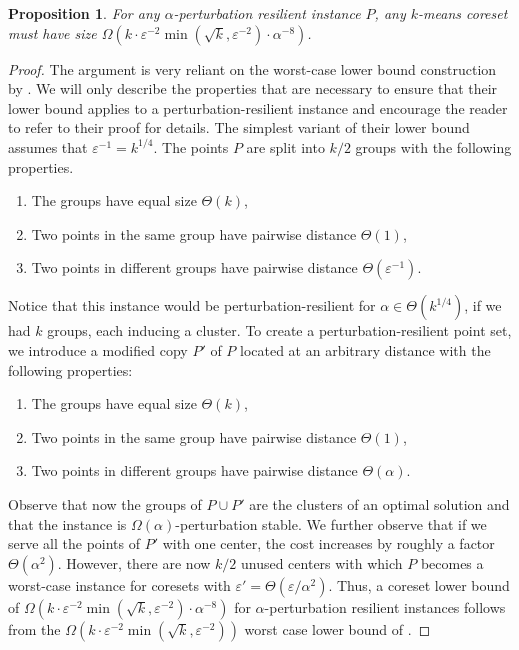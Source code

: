 \documentclass[11pt]{article}
\newtheorem{proposition}[lemma]{Proposition}
\theoremstyle{restate}
\theoremstyle{definition}
\begin{document}
\begin{proposition}
For any $\alpha$-perturbation resilient instance $P$, any $k$-means coreset must have size $\Omega(k\cdot \varepsilon^{-2}\min(\sqrt{k},\varepsilon^{-2}) \cdot \alpha^{-8})$.
\end{proposition}
\begin{proof}
The argument is very reliant on the worst-case lower bound construction by \cite{HLW23}.
We will only describe the properties that are necessary to ensure that their lower bound applies to a perturbation-resilient instance and encourage the reader to refer to their proof for details.
The simplest variant of their lower bound assumes that $\varepsilon^{-1} = k^{1/4}.$
The points $P$ are split into $k/2$ groups with the following properties.
\begin{enumerate}
    \item The groups have equal size $\Theta(k)$,
    \item Two points in the same group have pairwise distance $\Theta(1)$,
    \item Two points in different groups have pairwise distance $\Theta(\varepsilon^{-1})$.
\end{enumerate}



Notice that this instance would be perturbation-resilient for $\alpha\in \Theta(k^{1/4})$, if we had $k$ groups, each inducing a cluster.
To create a perturbation-resilient point set, we introduce a modified copy $P'$ of $P$ located at an arbitrary distance with the following properties:
\begin{enumerate}
    \item The groups have equal size $\Theta(k)$,
    \item Two points in the same group have pairwise distance $\Theta(1)$,
    \item Two points in different groups have pairwise distance $\Theta(\alpha)$.
\end{enumerate}

Observe that now the groups of $P\cup P'$ are the clusters of an optimal solution and that the instance is $\Omega(\alpha)$-perturbation stable. We further observe that if we serve all the points of $P'$ with one center, the cost increases by roughly a factor $\Theta(\alpha^2)$.
However,  there are now $k/2$ unused centers with which $P$ becomes a worst-case instance for coresets with $\varepsilon' = \Theta(\varepsilon/\alpha^2)$. Thus, a coreset lower bound of $\Omega(k\cdot \varepsilon^{-2}\min(\sqrt{k},\varepsilon^{-2}) \cdot \alpha^{-8})$ for $\alpha$-perturbation resilient instances follows from the $\Omega(k\cdot \varepsilon^{-2}\min(\sqrt{k},\varepsilon^{-2}))$ worst case lower bound of \cite{HLW23}.
\end{proof}%
        
        
        \appendix
\end{document}
